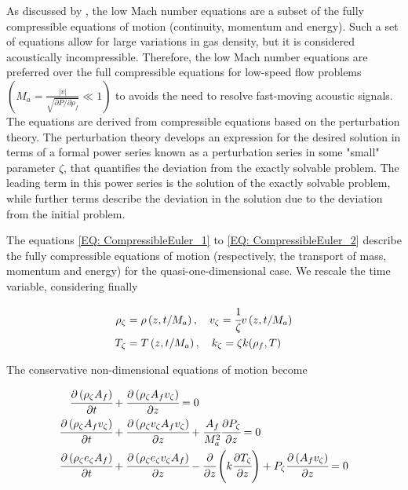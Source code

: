 \documentclass[../Article_Model_Parameters.tex]{subfiles}
\begin{document}
	
	As discussed by \citet{Lions2013}, the low Mach number equations are a subset of the fully compressible equations of motion (continuity, momentum and energy). Such a set of equations allow for large variations in gas density, but it is considered acoustically incompressible. Therefore, the low Mach number equations are preferred over the full compressible equations for low-speed flow problems $\left( M_a = \frac{|v|}{\sqrt{ \partial P / \partial \rho_f }} \ll 1 \right)$ to avoids the need to resolve fast-moving acoustic signals. The equations are derived from compressible equations based on the perturbation theory. The perturbation theory develops an expression for the desired solution in terms of a formal power series known as a perturbation series in some "small" parameter $\zeta$, that quantifies the deviation from the exactly solvable problem. The leading term in this power series is the solution of the exactly solvable problem, while further terms describe the deviation in the solution due to the deviation from the initial problem. 
	
	The equations \ref{EQ: CompressibleEuler_1} to \ref{EQ: CompressibleEuler_2} describe the fully compressible equations of motion (respectively, the transport of mass, momentum and energy) for the quasi-one-dimensional case. We rescale the time variable, considering finally 
	
	{\footnotesize
		\begin{align*}
			\rho_\zeta 	&= \rho\left( z, t/M_a \right), \quad
			v_\zeta 	= \cfrac{1}{\zeta} v\left( z, t/M_a \right) \\ 
			T_\zeta 	&= T\left( z, t/M_a \right),  \quad 
			k_\zeta 	= \zeta k(\rho_f, T) 
		\end{align*} 
	}
	
	The conservative non-dimensional equations of motion become
	
	{\footnotesize
		\begin{align*}
			\cfrac{\partial \left( \rho_\zeta A_f \right)}{\partial t} &+ \cfrac{\partial \left( \rho_\zeta A_f v_\zeta \right)}{\partial z} = 0 \\
			\cfrac{\partial \left( \rho_\zeta A_f v_\zeta \right) }{\partial t}	&+ \cfrac{\partial \left( \rho_\zeta v_\zeta A_f v_\zeta \right)}{\partial z} + \cfrac{A_f}{M_a^2} \cfrac{\partial P_\zeta}{\partial z} = 0\\
			\cfrac{\partial \left( \rho_\zeta e_\zeta A_f \right) }{\partial t} &+ \cfrac{\partial \left( \rho_\zeta e_\zeta v_\zeta A_f \right)}{\partial z} - \cfrac{\partial}{\partial z} \left( k \cfrac{\partial T_\zeta}{\partial z} \right) + P_\zeta \cfrac{\partial \left(A_f v_\zeta\right)}{\partial z} = 0
		\end{align*}
	}
	
\end{document}
